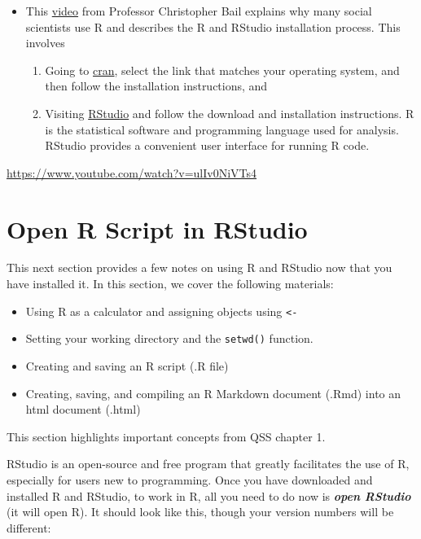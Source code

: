 \documentclass[
  letterpaper,
  DIV=11,
  numbers=noendperiod]{scrreprt}
\providecommand{\tightlist}{%
  \setlength{\itemsep}{0pt}\setlength{\parskip}{0pt}}\usepackage{longtable,booktabs,array}
\begin{document}
\begin{itemize}
\tightlist
\item
  This \href{http://www.youtube.com/embed/ulIv0NiVTs4?rel=0}{video} from
  Professor Christopher Bail explains why many social scientists use R
  and describes the R and RStudio installation process. This involves

  \begin{enumerate}
  \def\labelenumi{\arabic{enumi}.}
  \tightlist
  \item
    Going to \href{https://cran.r-project.org/}{cran}, select the link
    that matches your operating system, and then follow the installation
    instructions, and
  \item
    Visiting \href{http://www.rstudio.com/}{RStudio} and follow the
    download and installation instructions. R is the statistical
    software and programming language used for analysis. RStudio
    provides a convenient user interface for running R code.
  \end{enumerate}
\end{itemize}

\url{https://www.youtube.com/watch?v=ulIv0NiVTs4}

\hypertarget{open-r-script-in-rstudio}{%
\section{Open R Script in RStudio}\label{open-r-script-in-rstudio}}

This next section provides a few notes on using R and RStudio now that
you have installed it. In this section, we cover the following
materials:

\begin{itemize}
\tightlist
\item
  Using R as a calculator and assigning objects using
  \texttt{\textless{}-}
\item
  Setting your working directory and the \texttt{setwd()} function.
\item
  Creating and saving an R script (.R file)
\item
  Creating, saving, and compiling an R Markdown document (.Rmd) into an
  html document (.html)
\end{itemize}

This section highlights important concepts from QSS chapter 1.

RStudio is an open-source and free program that greatly facilitates the
use of R, especially for users new to programming. Once you have
downloaded and installed R and RStudio, to work in R, all you need to do
now is \textbf{\emph{open RStudio}} (it will open R). It should look
like this, though your version numbers will be different:
\end{document}

